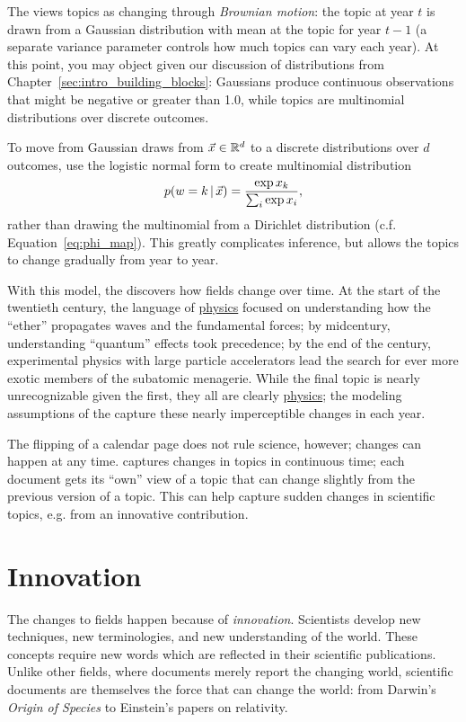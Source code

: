 The  views topics as changing through \emph{Brownian
  motion}: the topic at year $t$ is drawn from a Gaussian distribution
with mean at the topic for year $t-1$ (a separate variance parameter
controls how much topics can vary each year).  At this point, you may
object given our discussion of distributions from
Chapter~\ref{sec:intro_building_blocks}: Gaussians produce continuous
observations that might be negative or greater than 1.0, while topics are multinomial distributions over discrete outcomes.

To move from Gaussian draws from $\vec x \in \mathbb{R}^d$ to a discrete distributions
over $d$ outcomes, \citet{blei-06b} use the logistic normal form to
create multinomial distribution
\begin{equation}
p(w=k \, | \, \vec x)  = \frac{\exp{x_k}}{\sum_i \exp{x_i}},
\end{equation}
rather than drawing the multinomial from a Dirichlet distribution
(c.f. Equation~\ref{eq:phi_map}).
This greatly complicates inference, but allows the topics to change
gradually from year to year.

With this model, the  discovers how fields change over
time.  At the start of the twentieth century, the language of
\underline{physics} focused on understanding how the ``ether''
propagates waves and the fundamental forces; by midcentury,
understanding ``quantum'' effects took precedence; by the end of the
century, experimental physics with large particle accelerators lead
the search for ever more exotic members of the subatomic menagerie.
While the final topic is nearly unrecognizable given the first, they
all are clearly \underline{physics}; the modeling assumptions of the
 capture these nearly imperceptible changes in each year.

The flipping of a calendar page does not rule science, however;
changes can happen at any time.  \citet{wang-08} captures changes in
topics in continuous time; each document gets its ``own'' view of a
topic that can change slightly from the previous version of a topic.
This can help capture sudden changes in scientific topics, e.g. from
an innovative contribution.


\section{Innovation}

The changes to fields happen because of \emph{innovation}.  Scientists develop
new techniques, new terminologies, and new understanding of the world.  These
concepts require new words which are reflected in their scientific
publications.  Unlike other fields, where documents merely report the changing
world, scientific documents are themselves the force that can change the world:
from Darwin's \textit{Origin of Species} to Einstein's papers on relativity.

